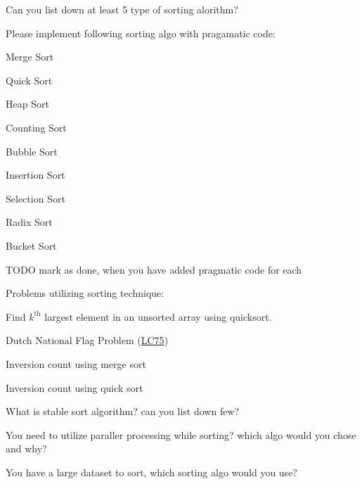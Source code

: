{\smaller[1] 
\begin{exercise}


    \begin{compactenum}
        \item Can you list down at least 5 type of sorting alorithm?
        \item Please implement following sorting algo with pragamatic code:
        \begin{compactenum}
             \item Merge Sort 
             \item Quick Sort
             \item  Heap Sort
             \item Counting Sort

             \item Bubble Sort
             \item Insertion Sort
             \item Selection Sort
             
             \item Radix Sort
             \item Bucket Sort
             \item  TODO mark as done, when you have added pragmatic code for each
             
        \end{compactenum}

        \item Problems utilizing sorting technique:
            \begin{compactenum}
                \item Find $ k^{\text{th}} $ largest element in an unsorted array using quicksort.
                \item Dutch National Flag Problem (\href{https://leetcode.com/problems/sort-colors/description/}{LC75})
                \item Inversion count using merge sort
                \item Inversion count using quick sort
            \end{compactenum}
        
        \item What is stable sort algorithm? can you list down few?
        \item You need to utilize paraller processing while sorting? which algo would you chose and why?
        \item You have a large dataset to sort, which sorting algo would you use?


\end{compactenum}
\end{exercise}}
